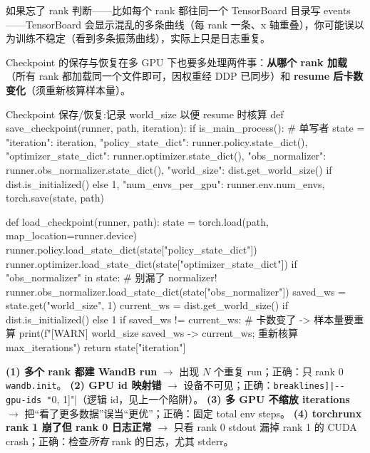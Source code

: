 如果忘了 rank 判断——比如每个 rank 都往同一个 TensorBoard 目录写 events——TensorBoard 会显示混乱的多条曲线（每 rank 一条、x 轴重叠），你可能误以为训练不稳定（看到多条振荡曲线），实际上只是日志重复。

Checkpoint 的保存与恢复在多 GPU 下也要多处理两件事：\textbf{从哪个 rank 加载}（所有 rank 都加载同一个文件即可，因权重经 DDP 已同步）和 \textbf{resume 后卡数变化}（须重新核算样本量）。

\begin{codebox}[Python]{Checkpoint 保存/恢复:记录 world\_size 以便 resume 时核算}
def save_checkpoint(runner, path, iteration):
    if is_main_process():                              # 单写者
        state = {
            "iteration": iteration,
            "policy_state_dict": runner.policy.state_dict(),
            "optimizer_state_dict": runner.optimizer.state_dict(),
            "obs_normalizer": runner.obs_normalizer.state_dict(),
            "world_size": dist.get_world_size() if dist.is_initialized() else 1,
            "num_envs_per_gpu": runner.env.num_envs,
        }
        torch.save(state, path)

def load_checkpoint(runner, path):
    state = torch.load(path, map_location=runner.device)
    runner.policy.load_state_dict(state["policy_state_dict"])
    runner.optimizer.load_state_dict(state["optimizer_state_dict"])
    if "obs_normalizer" in state:                      # 别漏了 normalizer!
        runner.obs_normalizer.load_state_dict(state["obs_normalizer"])
    saved_ws   = state.get("world_size", 1)
    current_ws = dist.get_world_size() if dist.is_initialized() else 1
    if saved_ws != current_ws:                         # 卡数变了 -> 样本量要重算
        print(f"[WARN] world_size {saved_ws} -> {current_ws}; 重新核算 max_iterations")
    return state["iteration"]
\end{codebox}

\begin{pitfall}
\textbf{(1) 多个 rank 都建 WandB run} $\to$ 出现 $N$ 个重复 run；正确：只 rank 0 \verb|wandb.init|。
\textbf{(2) GPU id 映射错} $\to$ 设备不可见；正确：\Verb[breaklines]|--gpu-ids "[0, 1]"|（逻辑 id，见上一个陷阱）。
\textbf{(3) 多 GPU 不缩放 iterations} $\to$ 把“看了更多数据”误当“更优”；正确：固定 total env steps。
\textbf{(4) torchrunx rank 1 崩了但 rank 0 日志正常} $\to$ 只看 rank 0 stdout 漏掉 rank 1 的 CUDA crash；正确：检查\emph{所有} rank 的日志，尤其 stderr。
\end{pitfall}

